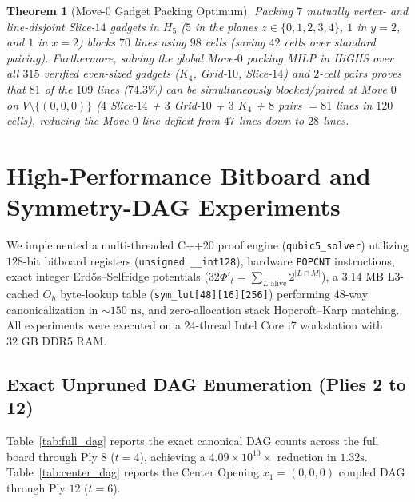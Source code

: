 \documentclass[11pt,a4paper]{article}
\newtheorem{theorem}{Theorem}[section]
\theoremstyle{definition}
\theoremstyle{remark}
\begin{document}
\begin{theorem}[Move-0 Gadget Packing Optimum]
\label{thm:move0_packing}
Packing $7$ mutually vertex- and line-disjoint Slice-$14$ gadgets in $H_5$ ($5$ in the planes $z \in \{0,1,2,3,4\}$, $1$ in $y=2$, and $1$ in $x=2$) blocks $70$ lines using $98$ cells (saving $42$ cells over standard pairing). Furthermore, solving the global Move-$0$ packing MILP in HiGHS over all $315$ verified even-sized gadgets ($K_4$, Grid-$10$, Slice-$14$) and $2$-cell pairs proves that $81$ of the $109$ lines ($74.3\%$) can be simultaneously blocked/paired at Move $0$ on $V \setminus \{(0,0,0)\}$ ($4$ Slice-$14$ + $3$ Grid-$10$ + $3$ $K_4$ + $8$ pairs $= 81$ lines in $120$ cells), reducing the Move-$0$ line deficit from $47$ lines down to $28$ lines.
\end{theorem}

\section{High-Performance Bitboard and Symmetry-DAG Experiments}

We implemented a multi-threaded C++20 proof engine (\texttt{qubic5\_solver}) utilizing $128$-bit bitboard registers (\texttt{unsigned \_\_int128}), hardware \texttt{POPCNT} instructions, exact integer Erd\H{o}s--Selfridge potentials ($32\Phi'_t = \sum_{L \text{ alive}} 2^{|L \cap M|}$), a $3.14\text{ MB}$ L3-cached $O_h$ byte-lookup table (\texttt{sym\_lut[48][16][256]}) performing $48$-way canonicalization in $\sim 150\text{ ns}$, and zero-allocation stack Hopcroft--Karp matching. All experiments were executed on a $24$-thread Intel Core i7 workstation with $32\text{ GB}$ DDR5 RAM.

\subsection{Exact Unpruned DAG Enumeration (Plies 2 to 12)}
Table~\ref{tab:full_dag} reports the exact canonical DAG counts across the full board through Ply $8$ ($t=4$), achieving a $4.09 \times 10^{10}\times$ reduction in $1.32\text{s}$. Table~\ref{tab:center_dag} reports the Center Opening $x_1 = (0,0,0)$ coupled DAG through Ply $12$ ($t=6$).
\end{document}
